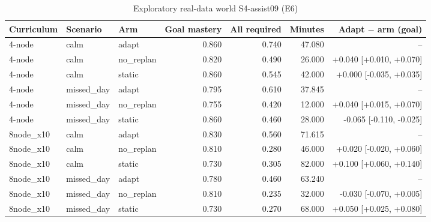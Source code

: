 \begin{table}[htbp]
\centering\small
\caption{Exploratory real-data world S4-assist09 (E6)}
\label{tab:t14}
\begin{tabular}{lllrrrr}
\toprule
Curriculum & Scenario & Arm & Goal mastery & All required & Minutes & Adapt $-$ arm (goal) \\
\midrule
4-node & calm & adapt & 0.860 & 0.740 & 47.080 & -- \\
4-node & calm & no\_replan & 0.820 & 0.490 & 26.000 & +0.040 [+0.010, +0.070] \\
4-node & calm & static & 0.860 & 0.545 & 42.000 & +0.000 [-0.035, +0.035] \\
4-node & missed\_day & adapt & 0.795 & 0.610 & 37.845 & -- \\
4-node & missed\_day & no\_replan & 0.755 & 0.420 & 12.000 & +0.040 [+0.015, +0.070] \\
4-node & missed\_day & static & 0.860 & 0.460 & 28.000 & -0.065 [-0.110, -0.025] \\
8node\_x10 & calm & adapt & 0.830 & 0.560 & 71.615 & -- \\
8node\_x10 & calm & no\_replan & 0.810 & 0.280 & 46.000 & +0.020 [-0.020, +0.060] \\
8node\_x10 & calm & static & 0.730 & 0.305 & 82.000 & +0.100 [+0.060, +0.140] \\
8node\_x10 & missed\_day & adapt & 0.780 & 0.460 & 63.240 & -- \\
8node\_x10 & missed\_day & no\_replan & 0.810 & 0.235 & 32.000 & -0.030 [-0.070, +0.005] \\
8node\_x10 & missed\_day & static & 0.730 & 0.270 & 68.000 & +0.050 [+0.025, +0.080] \\
\bottomrule
\end{tabular}
\end{table}
